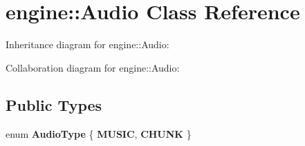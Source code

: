 \hypertarget{classengine_1_1_audio}{}\section{engine\+:\+:Audio Class Reference}
\label{classengine_1_1_audio}


Inheritance diagram for engine\+:\+:Audio\+:


Collaboration diagram for engine\+:\+:Audio\+:
\subsection*{Public Types}
\begin{DoxyCompactItemize}
\item 
enum {\bfseries Audio\+Type} \{ {\bfseries M\+U\+S\+IC}, 
{\bfseries C\+H\+U\+NK}
 \}\hypertarget{classengine_1_1_audio_a67352b26a495af6b26a02f8ffa773edb}{}\label{classengine_1_1_audio_a67352b26a495af6b26a02f8ffa773edb}

\end{DoxyCompactItemize}
